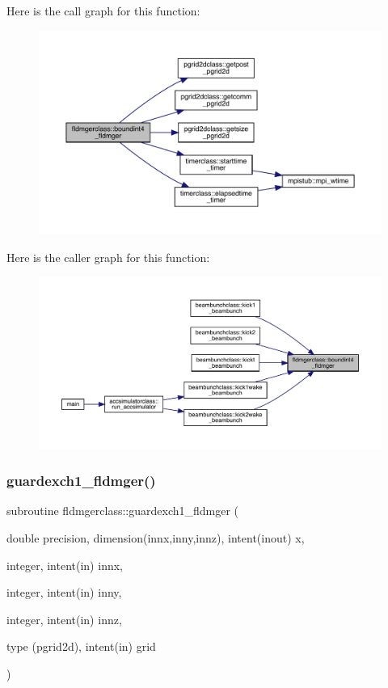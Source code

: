 Here is the call graph for this function\+:\nopagebreak
\begin{figure}[H]
\begin{center}
\leavevmode
\includegraphics[width=350pt]{namespacefldmgerclass_a490fceb1792fb1664488b1394dcff5f0_cgraph}
\end{center}
\end{figure}
Here is the caller graph for this function\+:\nopagebreak
\begin{figure}[H]
\begin{center}
\leavevmode
\includegraphics[width=350pt]{namespacefldmgerclass_a490fceb1792fb1664488b1394dcff5f0_icgraph}
\end{center}
\end{figure}
\mbox{\label{namespacefldmgerclass_a028236bf0d8419b6f75a7fb28eb7226b}} 
\subsubsection{\texorpdfstring{guardexch1\_fldmger()}{guardexch1\_fldmger()}}
{\footnotesize\ttfamily subroutine fldmgerclass\+::guardexch1\+\_\+fldmger (\begin{DoxyParamCaption}\item[{double precision, dimension(innx,inny,innz), intent(inout)}]{x,  }\item[{integer, intent(in)}]{innx,  }\item[{integer, intent(in)}]{inny,  }\item[{integer, intent(in)}]{innz,  }\item[{type (pgrid2d), intent(in)}]{grid }\end{DoxyParamCaption})}



